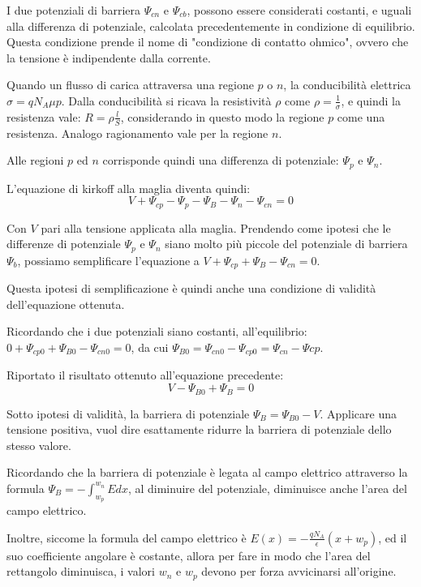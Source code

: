 \documentclass[../template]{subfiles}
\begin{document}
I due potenziali di barriera $\Psi_{cn}$ e $\Psi_{cb}$, possono essere considerati costanti, e uguali alla differenza di potenziale, calcolata precedentemente in condizione di equilibrio.
Questa condizione prende il nome di "condizione di contatto ohmico", ovvero che la tensione è indipendente dalla corrente.

Quando un flusso di carica attraversa una regione $p$ o $n$, la conducibilità elettrica $\sigma = q N_A \mu p$. Dalla conducibilità si ricava la resistività $\rho$ come $\rho = \frac{1}{\sigma}$, e quindi la resistenza vale: $R = \rho \frac{l}{S}$, considerando in questo modo la regione $p$ come una resistenza. Analogo ragionamento vale per la regione $n$.

Alle regioni $p$ ed $n$ corrisponde quindi una differenza di potenziale: $\Psi_p$ e $\Psi_n$.

L'equazione di kirkoff alla maglia diventa quindi:
\[
    V + \Psi_{cp} - \Psi_p - \Psi_B - \Psi_n - \Psi_{cn} = 0
\]

Con $V$ pari alla tensione applicata alla maglia. Prendendo come ipotesi che le differenze di potenziale $\Psi_p$ e $\Psi_n$ siano molto più piccole del potenziale di barriera $\Psi_b$, possiamo semplificare l'equazione a $V + \Psi_{cp} + \Psi_B - \Psi_{cn} = 0$.

Questa ipotesi di semplificazione è quindi anche una condizione di validità dell'equazione ottenuta.

Ricordando che i due potenziali siano costanti, all'equilibrio: $0 + \Psi_{cp0} + \Psi_{B0} - \Psi_{cn0} = 0 $, da cui $\Psi_{B0} = \Psi_{cn0} - \Psi_{cp0} = \Psi_{cn} - \Psi{cp}$.

Riportato il risultato ottenuto all'equazione precedente:
\[
    V - \Psi_{B0} + \Psi_B = 0
\]

Sotto ipotesi di validità, la barriera di potenziale $\Psi_B = \Psi_{B0} - V$. Applicare una tensione positiva, vuol dire esattamente ridurre la barriera di potenziale dello stesso valore.

Ricordando che la barriera di potenziale è legata al campo elettrico attraverso la formula $\Psi_B = - \int^{w_n}_{w_p} E dx$, al diminuire del potenziale, diminuisce anche l'area del campo elettrico.

Inoltre, siccome la formula del campo elettrico è $E(x) = - \frac{qN_A}{\epsilon} (x + w_p)$, ed il suo coefficiente angolare è costante, allora per fare in modo che l'area del rettangolo diminuisca, i valori $w_n$ e $w_p$ devono per forza avvicinarsi all'origine.
\end{document}
